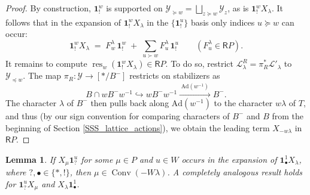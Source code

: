 \documentclass{amsart}
\newcommand{\Ring}{\mathsf{R}}
\newcommand{\bone}{\mathbf{1}}
\newtheorem{Lem}[Thm]{Lemma}
\theoremstyle{definition}
\numberwithin{equation}{section}
\begin{document}
\begin{proof}
By construction, $\bone_!^w$ is supported on {
$\mathcal{Y}_{\succeq w}=\bigsqcup_{z\succeq w}\mathcal{Y}_z$}, as is $\bone_!^w X_\lambda$. It follows that in the
expansion of $\bone_!^w X_\lambda$ in the $\{\bone_!^u\}$ basis only indices $u\succeq w$ can occur:
\[
\bone_!^w X_\lambda \;=\; F_w^\lambda\,\bone_!^w \;+\; \sum_{u\succ w} F_u^\lambda\,\bone_!^u
\qquad (F_u^\lambda\in \Ring P).
\]
It remains to compute $\operatorname{res}_w(\bone_!^w X_\lambda)\in \Ring P$.
To do so, restrict $\mathcal L_\lambda^R=\pi_R^*\mathcal L'_\lambda$ to $\mathcal{Y}_{\preceq w}$.
The map $\pi_R:\mathcal Y\to[*/B^-]$ restricts on stabilizers as
\[
B\cap wB^-w^{-1}\hookrightarrow wB^-w^{-1}\xrightarrow{\;\mathrm{Ad}(w^{-1})\;} B^-.
\]
The character $\lambda$ of $B^-$ then pulls back along $\mathrm{Ad}(w^{-1})$ to the character $w\lambda$ of $T$,
and thus (by our sign convention for comparing characters of $B^-$ and $B$ { from the beginning of Section \ref{SSS_lattice_actions}}), we obtain the leading term $X_{-w\lambda}$ in $\Ring P$.
\end{proof}



\begin{Lem}\label{Lem:convexity}
If $X_{\mu}\bone_?^u$ for some $\mu\in P$ and $u\in W$ occurs in the expansion of $\bone_\bullet^1 X_\lambda$, where $?,\bullet\in \{*,!\}$, then $\mu\in \operatorname{Conv}(-W\lambda)$. A completely analogous result holds for $\bone_?^u X_\mu$ and $X_\lambda \bone_\bullet^1$.
\end{Lem}
\end{document}
